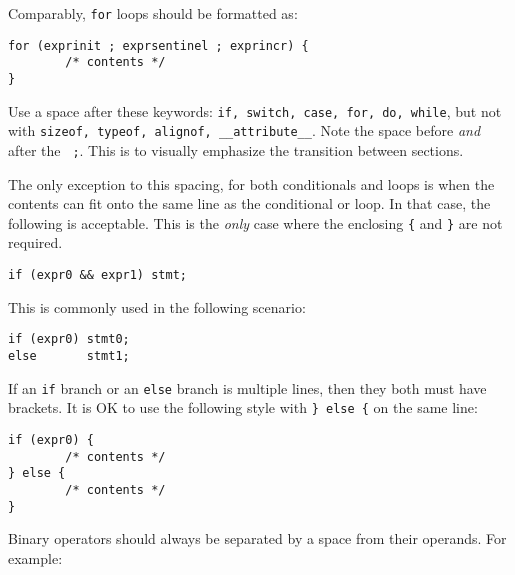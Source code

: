\documentclass[11pt,onecolumn]{article}
\newcommand{\head}[1]{\vspace{0.4em}\noindent{\bf #1}}
\begin{document}
Comparably, {\tt for} loops should be formatted as:

    \begin{minipage}{3in}
      \footnotesize
      \lstset{language=C}
      \begin{lstlisting}
for (exprinit ; exprsentinel ; exprincr) {
        /* contents */
}
      \end{lstlisting}
    \end{minipage}

Use a space after these keywords: {\tt if, switch, case, for, do,
  while}, but not with {\tt sizeof, typeof, alignof,
  \_\_attribute\_\_}.  Note the space before {\em and} after the {\tt
  ;}.  This is to visually emphasize the transition between sections.

The only exception to this spacing, for both conditionals and loops is
when the contents can fit onto the same line as the conditional or
loop.  In that case, the following is acceptable.  This is the {\em
  only} case where the enclosing {\tt \{} and {\tt \}} are not
required.

    \begin{minipage}{3in}
      \footnotesize
      \lstset{language=C}
      \begin{lstlisting}
if (expr0 && expr1) stmt;
      \end{lstlisting}
    \end{minipage}

This is commonly used in the following scenario:

    \begin{minipage}{3in}
      \footnotesize
      \lstset{language=C}
      \begin{lstlisting}
if (expr0) stmt0;
else       stmt1;
      \end{lstlisting}
    \end{minipage}

If an {\tt if} branch or an {\tt else} branch is multiple lines, then
they both must have brackets.  It is OK to use the following style
with {\tt \} else \{} on the same line:

    \begin{minipage}{3in}
      \footnotesize
      \lstset{language=C}
      \begin{lstlisting}
if (expr0) {
        /* contents */
} else {
        /* contents */
}
      \end{lstlisting}
    \end{minipage}


\head{Expression spacing.}  Binary operators should always be
separated by a space from their operands.  For example:
\end{document}
